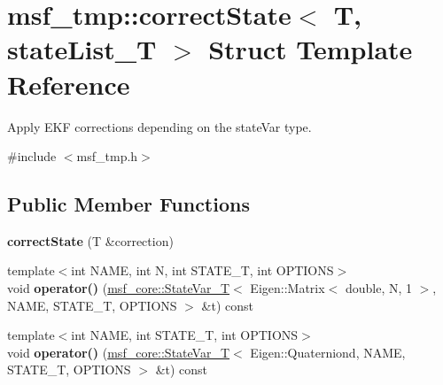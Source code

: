\hypertarget{structmsf__tmp_1_1correctState}{\section{msf\-\_\-tmp\-:\-:correct\-State$<$ T, state\-List\-\_\-\-T $>$ Struct Template Reference}
\label{structmsf__tmp_1_1correctState}
}


Apply E\-K\-F corrections depending on the state\-Var type.  




{\ttfamily \#include $<$msf\-\_\-tmp.\-h$>$}

\subsection*{Public Member Functions}
\begin{DoxyCompactItemize}
\item 
\hypertarget{structmsf__tmp_1_1correctState_a7e1bbad053e3cbfedeaf3badf598e12b}{{\bfseries correct\-State} (T \&correction)}\label{structmsf__tmp_1_1correctState_a7e1bbad053e3cbfedeaf3badf598e12b}

\item 
\hypertarget{structmsf__tmp_1_1correctState_ab4832ee8c894ea3360076131c840abc2}{{\footnotesize template$<$int N\-A\-M\-E, int N, int S\-T\-A\-T\-E\-\_\-\-T, int O\-P\-T\-I\-O\-N\-S$>$ }\\void {\bfseries operator()} (\hyperlink{structmsf__core_1_1StateVar__T}{msf\-\_\-core\-::\-State\-Var\-\_\-\-T}$<$ Eigen\-::\-Matrix$<$ double, N, 1 $>$, N\-A\-M\-E, S\-T\-A\-T\-E\-\_\-\-T, O\-P\-T\-I\-O\-N\-S $>$ \&t) const }\label{structmsf__tmp_1_1correctState_ab4832ee8c894ea3360076131c840abc2}

\item 
\hypertarget{structmsf__tmp_1_1correctState_a0c74a4126c2ecaa2a8843fe47bacecc0}{{\footnotesize template$<$int N\-A\-M\-E, int S\-T\-A\-T\-E\-\_\-\-T, int O\-P\-T\-I\-O\-N\-S$>$ }\\void {\bfseries operator()} (\hyperlink{structmsf__core_1_1StateVar__T}{msf\-\_\-core\-::\-State\-Var\-\_\-\-T}$<$ Eigen\-::\-Quaterniond, N\-A\-M\-E, S\-T\-A\-T\-E\-\_\-\-T, O\-P\-T\-I\-O\-N\-S $>$ \&t) const }\label{structmsf__tmp_1_1correctState_a0c74a4126c2ecaa2a8843fe47bacecc0}

\end{DoxyCompactItemize}


